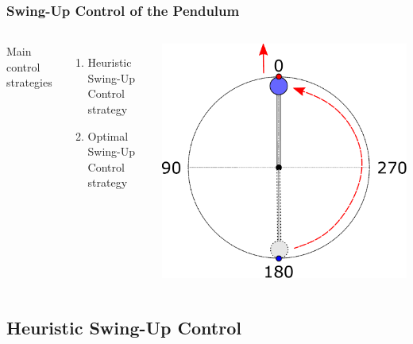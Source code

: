 \documentclass[]{beamer}
\begin{document}
\begin{frame}
	\frametitle{Swing-Up Control of the Pendulum}	
	\begin{columns}[c]	
		Main control strategies
		\begin{enumerate}
			\item Heuristic Swing-Up Control strategy\\
			\item Optimal Swing-Up Control strategy
		\end{enumerate}
		\includegraphics[scale=0.29]{images/OP_total.pdf}
	\end{columns}
\end{frame}

\subsection{Heuristic Swing-Up Control}
\end{document}
